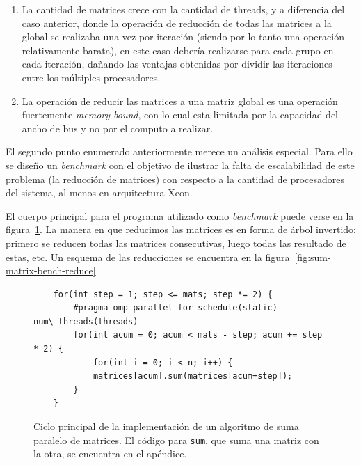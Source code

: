 \begin{enumerate}
    \item La cantidad de matrices crece con la cantidad de threads, y a diferencia
    del caso anterior, donde la operaci\'on de reducci\'on de todas las matrices
    a la global se realizaba una vez por iteraci\'on (siendo por lo tanto
    una operaci\'on relativamente barata), en este caso deber\'ia realizarse para
    cada grupo en cada iteraci\'on, da\~nando las ventajas obtenidas por dividir
    las iteraciones entre los m\'ultiples procesadores.
    \item La operaci\'on de reducir las matrices a una matriz global es una
    operaci\'on fuertemente \textit{memory-bound}, con lo cual esta limitada por
    la capacidad del ancho de bus y no por el computo a realizar.
\end{enumerate}

El segundo punto enumerado anteriormente merece un an\'alisis especial. Para ello
se dise\~no un \textit{benchmark} con el objetivo de ilustrar la falta
de escalabilidad de este problema (la reducci\'on de matrices) con respecto
a la cantidad de procesadores del sistema, al menos en arquitectura Xeon.

El cuerpo principal para el programa utilizado como \textit{benchmark} puede
verse en la figura~\ref{code:sum-matrix-bench-code}. La manera en que reducimos
las matrices es en forma de \'arbol invertido: primero se reducen todas las
matrices consecutivas, luego todas las resultado de estas, etc. Un esquema de
las reducciones se encuentra en la figura~\ref{fig:sum-matrix-bench-reduce}.

\begin{figure}[htbp]
    \begin{lstlisting}
    for(int step = 1; step <= mats; step *= 2) {
        #pragma omp parallel for schedule(static) num\_threads(threads)
        for(int acum = 0; acum < mats - step; acum += step * 2) {
            for(int i = 0; i < n; i++) {
            matrices[acum].sum(matrices[acum+step]);
        }
    }
    \end{lstlisting}
    \caption{Ciclo principal de la implementaci\'on de un algoritmo de suma paralelo de matrices.
    El c\'odigo para \texttt{sum}, que suma una matriz con la otra, se encuentra en el ap\'endice.}
    \label{code:sum-matrix-bench-code}
\end{figure}


